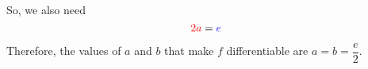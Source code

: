 \begin{solution}
So, we also need
\[\textcolor{red}{2a}=\textcolor{blue}{e}\]

Therefore, the values of $a$ and $b$ that make $f$ differentiable are $a=b=\dfrac{e}{2}$.

\end{solution}
